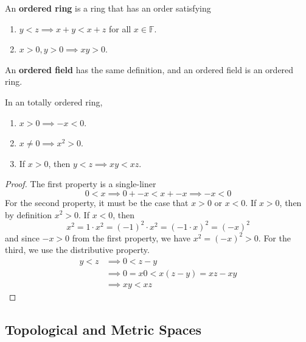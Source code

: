   \begin{definition}
    An \textbf{ordered ring} is a ring that has an order satisfying 
    \begin{enumerate}
      \item $y < z \implies x + y < x + z$ for all $x \in \mathbb{F}$. 
      \item $x > 0, y > 0 \implies xy > 0$. 
    \end{enumerate}
    An \textbf{ordered field} has the same definition, and an ordered field is an ordered ring. 
  \end{definition}

  \begin{theorem}[Properties]
    In an totally ordered ring, 
    \begin{enumerate}
      \item $x > 0 \implies -x < 0$. 
      \item $x \neq 0 \implies x^2 > 0$. 
      \item If $x > 0$, then $y < z \implies xy < xz$. 
    \end{enumerate}
  \end{theorem} 
  \begin{proof}
    The first property is a single-liner 
    \begin{equation}
      0 < x \implies 0 + -x < x + -x \implies -x < 0 
    \end{equation}
    For the second property, it must be the case that $x > 0$ or $x < 0$. If $x > 0$, then by definition $x^2 > 0$. If $x < 0$, then 
    \begin{equation}
      x^2 = 1 \cdot x^2 = (-1)^2 \cdot x^2 = (-1 \cdot x)^2 = (-x)^2
    \end{equation}
    and since $-x > 0$ from the first property, we have $x^2 = (-x)^2 > 0$. For the third, we use the distributive property. 
    \begin{align}
      y < z & \implies 0 < z - y \\ 
            & \implies 0 = x 0 < x(z - y) = xz - xy \\
            & \implies xy < xz
    \end{align}
  \end{proof}

\subsection{Topological and Metric Spaces} 

  \begin{definition}[Topology]
    
  \end{definition}

